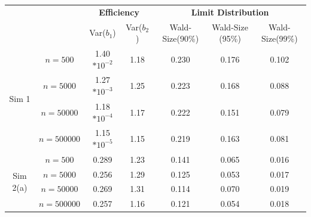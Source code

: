 \documentclass[11pt, fleqn]{article}
\begin{document}
 \begin{table}[H]
\begin{center}
\tiny

\begin{tabular}{|cc|cc|ccc|}

\hline
& & \multicolumn{2}{c|}{\textbf{Efficiency}} & \multicolumn{3}{c|}{\textbf{Limit Distribution }}  \\

& & \multicolumn{1}{c}{Var($b_1$)}& \multicolumn{1}{c|}{Var($b_2$)}
  & \multicolumn{1}{c}{Wald-Size(90\%)}
                & \multicolumn{1}{c}{Wald-Size (95\%)}      & \multicolumn{1}{c|}{Wald-Size(99\%)}
\\ \hline

  \multirow{4}{*}{\begin{sideways}\parbox{2cm}{\centering Sim 1}\end{sideways}}



&\hspace{-0.7cm}$ n=500$   & 1.40$*10^{-2}$&1.18  &0.230 &   0.176   & 0.102      \\  [0.18cm]
&\hspace{-0.7cm}$n=5000$   & 1.27$*10^{-3}$&1.25  &0.223 &   0.168   & 0.088     \\ [0.18cm]
&\hspace{-0.5cm}$n=50000$  & 1.18$*10^{-4}$&1.17  &0.222 &   0.151   & 0.079      \\  [0.18cm]
&\hspace{-0.30cm}$n=500000$& 1.15$*10^{-5}$&1.15  &0.219 &   0.163   & 0.081       \\ [0.18cm]


  \hline








  \multirow{4}{*}{\begin{sideways}\parbox{2cm}{\centering Sim 2(a) }\end{sideways}}

&\hspace{-0.7cm}$ n=500$      &0.289 &1.23  &0.141  & 0.065    &0.016    \\  [0.18cm]
&\hspace{-0.7cm}$n=5000$      &0.256 &1.29  &0.125  & 0.053    &0.017   \\ [0.18cm]
&\hspace{-0.5cm}$n=50000$     &0.269 &1.31  &0.114  & 0.070    & 0.019   \\  [0.18cm]
&\hspace{-0.30cm}$n=500000$   &0.257 &1.16  &0.121  & 0.054    & 0.018    \\ [0.18cm]




\end{tabular}
\end{center}
\end{table}
\end{document}
